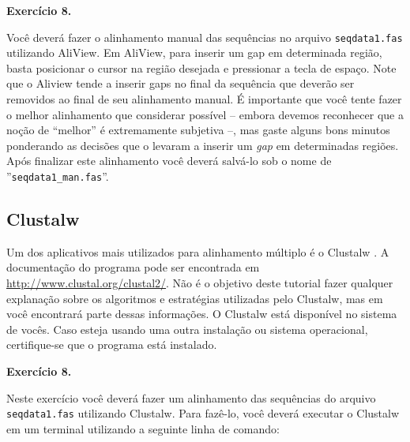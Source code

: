 \begin{refsection}
\begin{blackBlock}{\textbf{Exercício 8.}}\label{tut8:ex:8.1}

Você deverá fazer o alinhamento manual das sequências no arquivo \texttt{seqdata1.fas} utilizando AliView. Em AliView, para inserir um gap em determinada região, basta posicionar o cursor na região desejada e pressionar a tecla de espaço. Note que o Aliview tende a inserir gaps no final da sequência que deverão ser removidos ao final de seu alinhamento manual. É importante que você tente fazer o melhor alinhamento que considerar possível -- embora devemos reconhecer que a noção de ``melhor'' é extremamente subjetiva --, mas gaste alguns bons minutos ponderando as decisões que o levaram a inserir um \textit{gap} em determinadas regiões. Após finalizar este alinhamento você deverá salvá-lo sob o nome de ''\texttt{seqdata1\_man.fas}''.

\end{blackBlock}

\subsection{Clustalw}\label{tut8:msa:clustalw}

Um dos aplicativos mais utilizados para alinhamento múltiplo é o Clustalw \parencite{Larkin_et_al_2007}. A documentação do programa pode ser encontrada em \url{http://www.clustal.org/clustal2/}. Não é o objetivo deste tutorial fazer qualquer explanação sobre os algoritmos e estratégias utilizadas pelo Clustalw, mas em \textcite{Phillips_et_al_2000} você encontrará parte dessas informações. O Clustalw está disponível no sistema de vocês. Caso esteja usando uma outra instalação ou sistema operacional, certifique-se que o programa está instalado.


\begin{blackBlock}{\textbf{Exercício 8.}}\label{tut8:ex:8.2}

Neste exercício você deverá fazer um alinhamento das sequências do arquivo \texttt{seqdata1.fas} utilizando Clustalw. Para fazê-lo, você deverá executar o Clustalw em um terminal utilizando a seguinte linha de comando:\\

\scriptsize
{}\\
\normalsize

\end{blackBlock}



\end{refsection}
